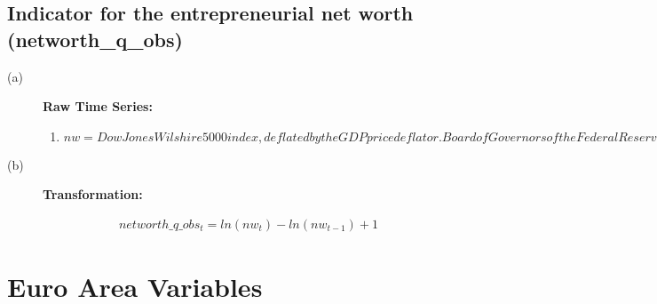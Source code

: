 \documentclass[3p,review,times]{elsarticle}		%
\begin{document}
\subsection{Indicator for the entrepreneurial net worth (networth\_q\_obs)}
\begin{description}
	\item[(a)] \textbf{Raw Time Series:}
	\begin{enumerate}
		\item $ nw = Dow Jones Wilshire 5000 index, deflated by the GDP price deflator. Board of Governors of the Federal Reserve System and US Department of Commerce - Bureau of Economic Analysis, Quarterly frequency$
	
	\end{enumerate}
	\item[(b)] \textbf{Transformation:}
	
	\begin{align*}
	networth\_q\_obs_t = ln \left(nw_t\right) - ln \left(nw_{t-1}\right)+1 
	\end{align*} 
\end{description}



\newpage
\section{Euro Area Variables}
\end{document}
